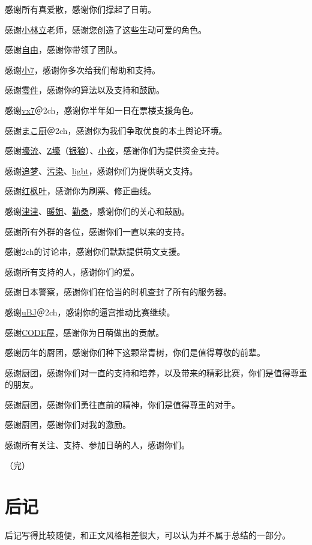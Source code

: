 感谢所有真爱散，感谢你们撑起了日萌。

感谢\uline{小林立}老师，感谢您创造了这些生动可爱的角色。

感谢\uline{自由}，感谢你带领了团队。

感谢\uline{小7}，感谢你多次给我们帮助和支持。

感谢\uline{零件}，感谢你的算法以及支持和鼓励。

感谢\uline{vx7}＠2ch，感谢你半年如一日在票楼支援角色。

感谢\uline{\mincho まこ厨}＠2ch，感谢你为我们争取优良的本土舆论环境。

感谢\uline{壕流}、\uline{Z壕}（\uline{银狼}）、\uline{小夜}，感谢你们为提供资金支持。

感谢\uline{追梦}、\uline{污染}、\uline{light}，感谢你们为提供萌文支持。

感谢\uline{红枫叶}，感谢你为刷票、修正曲线。

感谢\uline{津津}、\uline{暖姐}、\uline{勤桑}，感谢你们的关心和鼓励。

感谢所有外群的各位，感谢你们一直以来的支持。

感谢2ch的讨论串，感谢你们默默提供萌文支援。

感谢所有支持的人，感谢你们的爱。

感谢日本警察，感谢你们在恰当的时机查封了所有的服务器。

感谢\uline{uBJ}＠2ch，感谢你的逼宫推动比赛继续。

感谢\uline{CODE屋}，感谢你为日萌做出的贡献。

感谢历年的厨团，感谢你们种下这颗常青树，你们是值得尊敬的前辈。

感谢厨团，感谢你们对一直的支持和培养，以及带来的精彩比赛，你们是值得尊重的朋友。

感谢厨团，感谢你们勇往直前的精神，你们是值得尊重的对手。

感谢厨团，感谢你们对我的激励。

感谢所有关注、支持、参加日萌的人，感谢你们。

（完）

\chapter*{后记}

后记写得比较随便，和正文风格相差很大，可以认为并不属于总结的一部分。

